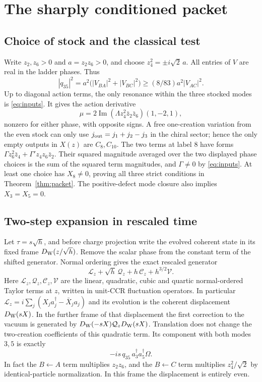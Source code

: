 \documentclass[11pt]{article}
\numberwithin{equation}{section}
\begin{document}
\section{The sharply conditioned packet}\label{sec:packet}

\subsection{Choice of stock and the classical test}

Write \(z_2,z_6>0\) and \(a=z_2z_6>0\), and choose
\(z_4^2=\pm i\sqrt2\,a\).
All entries of \(V\) are real in the ladder phases. Thus
\[
 |q_{35}|^2=a^2\big(|V_{BA}|^2+|V_{BC}|^2\big)
       \ge (8/83)a^2|V_{AC}|^2 .
\]
Up to diagonal action terms, the only resonance within the
three stocked modes is \eqref{eq:inputs}. It gives the
action derivative
\[
 \mu=2\operatorname{Im}(\Lambda z_4^2\bar z_2\bar z_6)
                  (1,-2,1),
\]
nonzero for either phase, with opposite signs. A free
one-creation variation from the even stock can only use
\(j_{\rm out}=j_1+j_2-j_3\) in the chiral sector; hence the
only empty outputs in \(X(z)\) are \(C_8,C_{10}\).
The two terms at label \(8\) have forms
\(\Gamma z_6^2\bar z_4+\Gamma' z_4z_6\bar z_2\).
Their squared magnitude averaged over the two displayed
phase choices is the sum of the squared term magnitudes,
and \(\Gamma\ne0\) by \eqref{eq:inputs}. At least one choice
has \(X_8\ne0\), proving all three strict conditions in
Theorem~\ref{thm:packet}. The positive-defect mode closure
also implies \(X_3=X_5=0\).

\subsection{Two-step expansion in rescaled time}

Let \(\tau=s\sqrt h\), and before charge projection write
the evolved coherent state in its fixed frame
\(D_{\rm W}(z/\sqrt h)\). Remove the scalar phase
from the constant term of the shifted generator.
Normal ordering gives the exact rescaled generator
\begin{equation}\label{eq:gen}
 \mathcal L_z+\sqrt h\,\mathcal Q_z
       +h\,\mathcal C_z+h^{3/2}\mathcal V .
\end{equation}
Here \(\mathcal L_z,\mathcal Q_z,\mathcal C_z,\mathcal V\)
are the linear, quadratic, cubic and quartic normal-ordered
Taylor terms at \(z\), written in unit-CCR fluctuation
operators. In particular
\(\mathcal L_z=i\sum_j(X_j a_j^\dagger-\bar X_j a_j)\)
and its evolution is the coherent displacement \(D_{\rm W}(sX)\).
In the further frame of that displacement the first correction
to the vacuum is generated by
\(D_{\rm W}(-sX)\mathcal Q_zD_{\rm W}(sX)\).
Translation does not change the two-creation coefficients
of this quadratic term. Its component with both modes \(3,5\)
is exactly
\begin{equation}\label{eq:coefficient}
 -i s\,q_{35}\,a_3^\dagger a_5^\dagger\Omega .
\end{equation}
In fact the \(B\leftarrow A\) term multiplies \(z_2z_6\), and the
\(B\leftarrow C\) term multiplies \(z_4^2/\sqrt2\)
by identical-particle normalization. In this frame the
displacement is entirely even.
\end{document}
